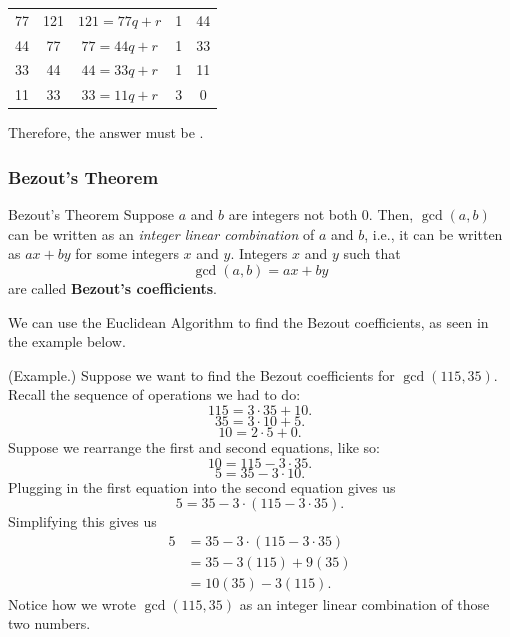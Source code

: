 \documentclass[letterpaper]{article}
\begin{document}
\begin{mdframed}
\begin{itemize}
\begin{mdframed}
\begin{center}
\begin{tabular}{|c|c|c|c|c|}
                    \hline 
                    77 & 121 & $121 = 77q + r$ & 1 & 44 \\ 
                    44 & 77 & $77 = 44q + r$ & 1 & 33 \\ 
                    33 & 44 & $44 = 33q + r$ & 1 & 11 \\ 
                    11 & 33 & $33 = 11q + r$ & 3 & 0 \\ 
                    \hline 
                \end{tabular}
            \end{center}
            Therefore, the answer must be .
        \end{mdframed}
    \end{itemize}
\end{mdframed}

\subsubsection{Bezout's Theorem}
\begin{theorem}{Bezout's Theorem}{}
    Suppose $a$ and $b$ are integers not both 0. Then, $\gcd(a, b)$ can be written as an \emph{integer linear combination} of $a$ and $b$, i.e., it can be written as $ax + by$ for some integers $x$ and $y$. Integers $x$ and $y$ such that \[\gcd(a, b) = ax + by\] are called \textbf{Bezout's coefficients}.
\end{theorem}

We can use the Euclidean Algorithm to find the Bezout coefficients, as seen in the example below. 
\begin{mdframed}
    (Example.) Suppose we want to find the Bezout coefficients for $\gcd(115, 35)$. Recall the sequence of operations we had to do:
    \[115 = 3 \cdot 35 + 10.\]
    \[35 = 3 \cdot 10 + 5.\]
    \[10 = 2 \cdot 5 + 0.\]
    Suppose we rearrange the first and second equations, like so: 
    \[10 = 115 - 3 \cdot 35.\] 
    \[5 = 35 - 3 \cdot 10.\]
    Plugging in the first equation into the second equation gives us 
    \[5 = 35 - 3 \cdot (115 - 3 \cdot 35).\]
    Simplifying this gives us 
    \begin{equation*}
        \begin{aligned}
            5 &= 35 - 3 \cdot (115 - 3 \cdot 35) \\ 
                &= 35 - 3(115) + 9(35) \\ 
                &= 10(35) - 3(115).
        \end{aligned}
    \end{equation*}
    Notice how we wrote $\gcd(115, 35)$ as an integer linear combination of those two numbers.
\end{mdframed}
\end{document}
